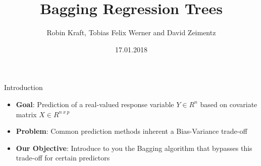 \documentclass{beamer}
\title[Bagging Regression Trees]{Bagging Regression Trees}
\author[Kraft, Werner, Zeimentz]{Robin Kraft, Tobias Felix Werner and David Zeimentz}
\institute[Uni. Bonn]{University of Bonn}
\date{17.01.2018}
\begin{document}
\begin{frame}
  \titlepage
\end{frame}


\begin{frame}{Introduction}
\begin{itemize}
\item \textbf{Goal}: Prediction of a real-valued response variable $Y\in R^{n}$ based on covariate matrix $X\in R^{n\:x\:p}$
\item \textbf{Problem}: Common prediction methods inherent a Bias-Variance trade-off
%
%
%
\item \textbf{Our Objective}: Introduce to you the Bagging algorithm that bypasses this trade-off for certain predictors
%
%
\end{itemize}
\end{frame}
\end{document}
